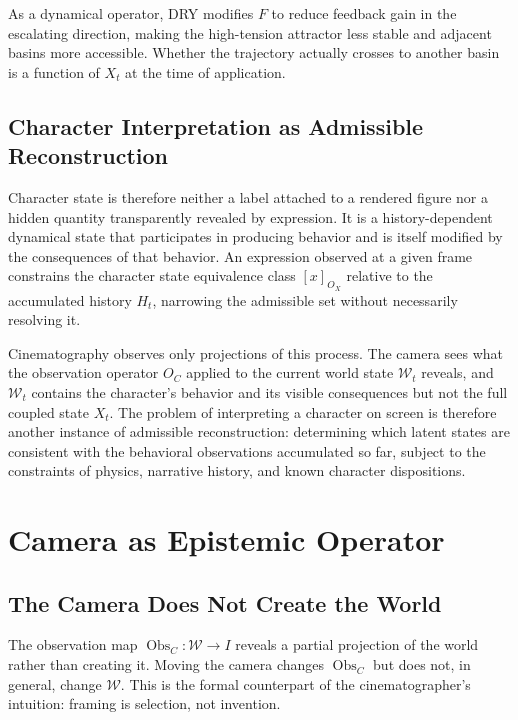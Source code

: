 \documentclass[11pt,a4paper]{article}
\theoremstyle{plain}
\theoremstyle{definition}
\theoremstyle{remark}
\DeclareMathOperator{\Obs}{Obs}
\begin{document}
As a dynamical operator, \textsc{DRY} modifies $F$ to reduce feedback gain in the escalating direction, making the high-tension attractor less stable and adjacent basins more accessible. Whether the trajectory actually crosses to another basin is a function of $X_t$ at the time of application.

\subsection{Character Interpretation as Admissible Reconstruction}

Character state is therefore neither a label attached to a rendered figure nor a hidden quantity transparently revealed by expression. It is a history-dependent dynamical state that participates in producing behavior and is itself modified by the consequences of that behavior. An expression observed at a given frame constrains the character state equivalence class $[x]_{O_X}$ relative to the accumulated history $H_t$, narrowing the admissible set without necessarily resolving it.

Cinematography observes only projections of this process. The camera sees what the observation operator $O_C$ applied to the current world state $\mathcal{W}_t$ reveals, and $\mathcal{W}_t$ contains the character's behavior and its visible consequences but not the full coupled state $X_t$. The problem of interpreting a character on screen is therefore another instance of admissible reconstruction: determining which latent states are consistent with the behavioral observations accumulated so far, subject to the constraints of physics, narrative history, and known character dispositions.


\section{Camera as Epistemic Operator}
\label{sec:camera}

\subsection{The Camera Does Not Create the World}

The observation map $\Obs_C : \mathcal{W} \to I$ reveals a partial projection of the world rather than creating it. Moving the camera changes $\Obs_C$ but does not, in general, change $\mathcal{W}$. This is the formal counterpart of the cinematographer's intuition: framing is selection, not invention.
\end{document}
